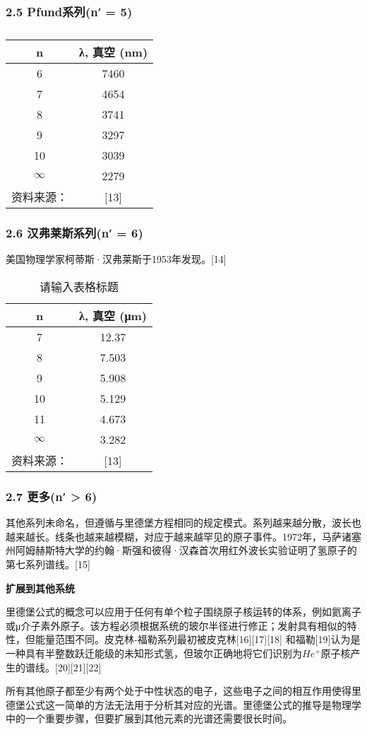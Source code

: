 \subsubsection{2.5 Pfund系列(n′ = 5)}
\begin{table}[ht]
\centering
\caption{ }\label{tab_QYZGP5}
\begin{tabular}{|c|c|}
\hline
n & λ, 真空
(nm)\\
\hline
6 & 7460\\
\hline
7 & 4654\\
\hline
8 & 3741 \\
\hline
9 &3297\\
\hline
10 &3039 \\
\hline
$\infty$ & 2279 \\
\hline
资料来源： & [13] \\
\hline
\end{tabular}
\end{table}
\subsubsection{2.6 汉弗莱斯系列(n′ = 6)}

美国物理学家柯蒂斯·汉弗莱斯于1953年发现。[14]\begin{table}[ht]
\centering
\caption{请输入表格标题}\label{tab_QYZGP6}
\begin{tabular}{|c|c|}
\hline
n & λ, 真空
(μm) \\
\hline
7 & 12.37 \\
\hline
8 & 7.503 \\
\hline
9 & 5.908 \\
\hline
10 & 5.129 \\
\hline
11 & 4.673\\
\hline
$\infty$ & 3.282 \\
\hline
资料来源： & [13] \\
\hline
\end{tabular}
\end{table}

\subsubsection{2.7 更多(n′ > 6)}
其他系列未命名，但遵循与里德堡方程相同的规定模式。系列越来越分散，波长也越来越长。线条也越来越模糊，对应于越来越罕见的原子事件。1972年，马萨诸塞州阿姆赫斯特大学的约翰·斯强和彼得·汉森首次用红外波长实验证明了氢原子的第七系列谱线。[15]


\textbf{扩展到其他系统}

里德堡公式的概念可以应用于任何有单个粒子围绕原子核运转的体系，例如氦离子或μ介子素外原子。该方程必须根据系统的玻尔半径进行修正；发射具有相似的特性，但能量范围不同。皮克林-福勒系列最初被皮克林[16][17][18] 和福勒[19]认为是一种具有半整数跃迁能级的未知形式氢，但玻尔正确地将它们识别为$He^+$原子核产生的谱线。[20][21][22]

所有其他原子都至少有两个处于中性状态的电子，这些电子之间的相互作用使得里德堡公式这一简单的方法无法用于分析其对应的光谱。里德堡公式的推导是物理学中的一个重要步骤，但要扩展到其他元素的光谱还需要很长时间。